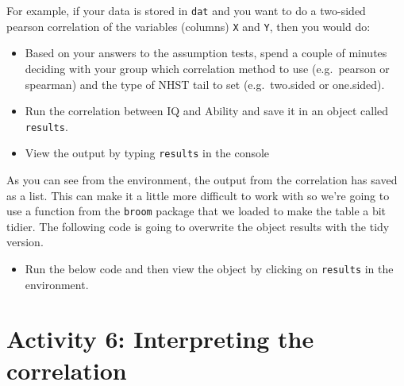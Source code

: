 \documentclass[]{book}
\newenvironment{Shaded}{\begin{snugshade}}{\end{snugshade}}
\newcommand{\CommentTok}[1]{\textcolor[rgb]{0.56,0.35,0.01}{\textit{#1}}}
\newcommand{\DataTypeTok}[1]{\textcolor[rgb]{0.13,0.29,0.53}{#1}}
\newcommand{\KeywordTok}[1]{\textcolor[rgb]{0.13,0.29,0.53}{\textbf{#1}}}
\newcommand{\NormalTok}[1]{#1}
\newcommand{\OperatorTok}[1]{\textcolor[rgb]{0.81,0.36,0.00}{\textbf{#1}}}
\newcommand{\StringTok}[1]{\textcolor[rgb]{0.31,0.60,0.02}{#1}}
\providecommand{\tightlist}{%
  \setlength{\itemsep}{0pt}\setlength{\parskip}{0pt}}
\begin{document}
For example, if your data is stored in \texttt{dat} and you want to do a two-sided pearson correlation of the variables (columns) \texttt{X} and \texttt{Y}, then you would do:

\begin{Shaded}
\end{Shaded}

\begin{itemize}
\tightlist
\item
  Based on your answers to the assumption tests, spend a couple of minutes deciding with your group which correlation method to use (e.g.~pearson or spearman) and the type of NHST tail to set (e.g.~two.sided or one.sided).
\item
  Run the correlation between IQ and Ability and save it in an object called \texttt{results}.
\item
  View the output by typing \texttt{results} in the console
\end{itemize}

As you can see from the environment, the output from the correlation has saved as a list. This can make it a little more difficult to work with so we're going to use a function from the \texttt{broom} package that we loaded to make the table a bit tidier. The following code is going to overwrite the object results with the tidy version.

\begin{itemize}
\tightlist
\item
  Run the below code and then view the object by clicking on \texttt{results} in the environment.
\end{itemize}

\begin{Shaded}
\end{Shaded}

\hypertarget{activity-6-interpreting-the-correlation}{%
\section{Activity 6: Interpreting the correlation}\label{activity-6-interpreting-the-correlation}}
\end{document}
